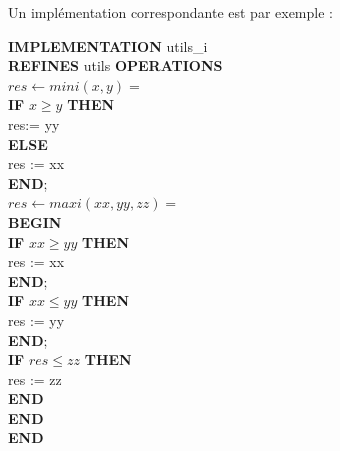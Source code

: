 \documentclass[10pt,a4paper]{article}
\begin{document}
Un implémentation correspondante est par exemple :

\noindent \textbf{IMPLEMENTATION}  utils\_i \\
\textbf{REFINES} utils
\textbf{OPERATIONS} \\
$res \leftarrow mini ( x , y ) =$ \\
\hspace*{1em}    \textbf{IF}  $x \geq y$ \textbf{THEN} \\
\hspace*{2em}        res:= yy \\
\hspace*{1em}    \textbf{ELSE} \\
\hspace*{2em}        res := xx \\
\hspace*{1em}    \textbf{END}; \\
$res \leftarrow maxi ( xx , yy , zz ) = $ \\
\hspace*{1em}    \textbf{BEGIN} \\
\hspace*{1em}    \textbf{IF} $xx \geq yy$ \textbf{THEN} \\
\hspace*{2em}        res := xx \\
\hspace*{1em}    \textbf{END}; \\
\hspace*{1em}   \textbf{IF} $xx \leq yy$  \textbf{THEN} \\
\hspace*{2em}        res := yy \\
\hspace*{1em}    \textbf{END}; \\
\hspace*{1em}   \textbf{IF} $res \leq zz$ \textbf{THEN} \\
\hspace*{2em}        res := zz \\
\hspace*{1em}    \textbf{END} \\
\hspace*{1em}    \textbf{END} \\
\textbf{END}
\end{document}
